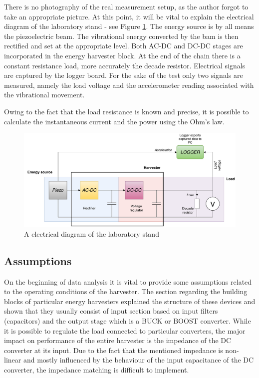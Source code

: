 \documentclass[12pt,a4paper]{article}
\begin{document}
There is no photography of the real measurement setup, as the author forgot to take an appropriate picture. At this point, it will be vital to explain the electrical diagram of the laboratory stand - see Figure \ref{fig:electrical}. The energy source is by all means the piezoelectric beam. The vibrational energy converted by the bam is then rectified and set at the appropriate level. Both AC-DC and DC-DC stages are incorporated in the energy harvester block. At the end of the chain there is a constant resistance load, more accurately the decade resistor. Electrical signals are captured by the logger board. For the sake of the test only two signals are measured, namely the load voltage and the accelerometer reading associated with the vibrational movement.
\par
Owing to the fact that the load resistance is known and precise, it is possible to calculate the instantaneous current and the power using the Ohm's law. 
\begin{figure}[ht!]
\includegraphics[scale=0.6]{electricaldiagram.pdf}
\caption{A electrical diagram of the laboratory stand}
\label{fig:electrical}
\end{figure}

\par

\subsection{Assumptions}

On the beginning of data analysis it is vital to provide some assumptions related to the operating conditions of the harvester. The section regarding the building blocks of particular energy harvesters explained the structure of these devices and shown that they usually consist of input section based on input filters (capacitors) and the output stage which is a BUCK or BOOST converter. While it is possible to regulate the load connected to particular converters, the major impact on performance of the entire harvester is the impedance of the DC converter at its input. Due to the fact that the mentioned impedance is non-linear and mostly influenced by the behaviour of the input capacitance of the DC converter, the impedance matching is difficult to implement.\par
\end{document}
